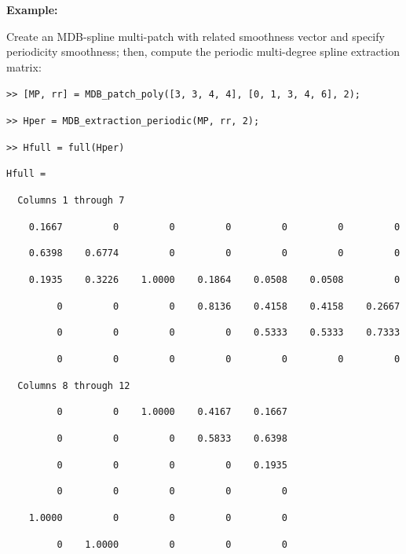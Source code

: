 \documentclass[10pt]{./acmtrans2e}
\newenvironment{example}
{\vspace*{0.1cm}
\noindent \textbf{Example:} \vspace*{0.15cm}

\setlength{\parskip}{0.5ex plus 0.5exminus 0.2 ex}
}
{\medskip
}
\begin{document}
\begin{example}
\noindent Create an MDB-spline multi-patch with related smoothness vector and specify periodicity smoothness; then, compute the periodic multi-degree spline extraction matrix:
\medskip

\texttt{>> [MP, rr] = MDB\_patch\_poly([3, 3, 4, 4], [0, 1, 3, 4, 6], 2);}

\texttt{>> Hper = MDB\_extraction\_periodic(MP, rr, 2);}

\texttt{>> Hfull = full(Hper)}

\texttt{Hfull =}

\texttt{\ \ Columns 1 through 7}

\texttt{\ \ \ \ 0.1667\ \ \ \ \ \ \ \ \ 0\ \ \ \ \ \ \ \ \ 0\ \ \ \ \ \ \ \ \ 0\ \ \ \ \ \ \ \ \ 0\ \ \ \ \ \ \ \ \ 0\ \ \ \ \ \ \ \ \ 0}

\texttt{\ \ \ \ 0.6398\ \ \ \ 0.6774\ \ \ \ \ \ \ \ \ 0\ \ \ \ \ \ \ \ \ 0\ \ \ \ \ \ \ \ \ 0\ \ \ \ \ \ \ \ \ 0\ \ \ \ \ \ \ \ \ 0}

\texttt{\ \ \ \ 0.1935\ \ \ \ 0.3226\ \ \ \ 1.0000\ \ \ \ 0.1864\ \ \ \ 0.0508\ \ \ \ 0.0508\ \ \ \ \ \ \ \ \ 0}

\texttt{\ \ \ \ \ \ \ \ \ 0\ \ \ \ \ \ \ \ \ 0\ \ \ \ \ \ \ \ \ 0\ \ \ \ 0.8136\ \ \ \ 0.4158\ \ \ \ 0.4158\ \ \ \ 0.2667}

\texttt{\ \ \ \ \ \ \ \ \ 0\ \ \ \ \ \ \ \ \ 0\ \ \ \ \ \ \ \ \ 0\ \ \ \ \ \ \ \ \ 0\ \ \ \ 0.5333\ \ \ \ 0.5333\ \ \ \ 0.7333}

\texttt{\ \ \ \ \ \ \ \ \ 0\ \ \ \ \ \ \ \ \ 0\ \ \ \ \ \ \ \ \ 0\ \ \ \ \ \ \ \ \ 0\ \ \ \ \ \ \ \ \ 0\ \ \ \ \ \ \ \ \ 0\ \ \ \ \ \ \ \ \ 0}

\texttt{\ \ Columns 8 through 12}

\texttt{\ \ \ \ \ \ \ \ \ 0\ \ \ \ \ \ \ \ \ 0\ \ \ \ 1.0000\ \ \ \ 0.4167\ \ \ \ 0.1667}

\texttt{\ \ \ \ \ \ \ \ \ 0\ \ \ \ \ \ \ \ \ 0\ \ \ \ \ \ \ \ \ 0\ \ \ \ 0.5833\ \ \ \ 0.6398}

\texttt{\ \ \ \ \ \ \ \ \ 0\ \ \ \ \ \ \ \ \ 0\ \ \ \ \ \ \ \ \ 0\ \ \ \ \ \ \ \ \ 0\ \ \ \ 0.1935}

\texttt{\ \ \ \ \ \ \ \ \ 0\ \ \ \ \ \ \ \ \ 0\ \ \ \ \ \ \ \ \ 0\ \ \ \ \ \ \ \ \ 0\ \ \ \ \ \ \ \ \ 0}

\texttt{\ \ \ \ 1.0000\ \ \ \ \ \ \ \ \ 0\ \ \ \ \ \ \ \ \ 0\ \ \ \ \ \ \ \ \ 0\ \ \ \ \ \ \ \ \ 0}

\texttt{\ \ \ \ \ \ \ \ \ 0\ \ \ \ 1.0000\ \ \ \ \ \ \ \ \ 0\ \ \ \ \ \ \ \ \ 0\ \ \ \ \ \ \ \ \ 0}
\end{example}
\end{document}
